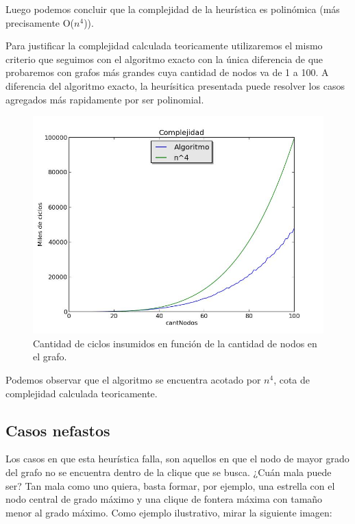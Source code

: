 Luego podemos concluir que la complejidad de la heurística es polinómica (más precisamente O($n^{4}$)). 

Para justificar la complejidad calculada teoricamente utilizaremos el mismo criterio que seguimos con el algoritmo exacto con la única diferencia de que probaremos con grafos más grandes cuya cantidad de nodos va de 1 a 100. A diferencia del algoritmo exacto, la heurísitica presentada puede resolver los casos agregados más rapidamente por ser polinomial.

\begin{figure}[H]
\centering\includegraphics[width=11 cm]{goloso/grafico.jpg}
\caption{Cantidad de ciclos insumidos en función de la cantidad de nodos en el grafo.}
\end{figure}

Podemos observar que el algoritmo se encuentra acotado por $n^4$, cota de complejidad calculada teoricamente.


\subsection{Casos nefastos}

Los casos en que esta heurística falla, son aquellos en que el nodo de mayor grado del grafo no se encuentra dentro de la clique que se busca. 
¿Cuán mala puede ser? Tan mala como uno quiera, basta formar, por ejemplo, una estrella con el nodo central de grado máximo y una clique de fontera máxima con tamaño menor al grado máximo. Como ejemplo ilustrativo, mirar la siguiente imagen:

